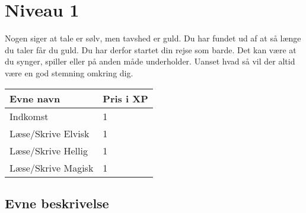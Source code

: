 \chapter*{Niveau 1}
Nogen siger at tale er sølv, men tavshed er guld. Du har fundet ud af at så længe du taler får du guld. Du har derfor startet din rejse som barde. Det kan være at du synger, spiller eller på anden måde underholder. Uanset hvad så vil der altid være en god stemning omkring dig.
\begin{table}[H]
    \centering
    \begin{tabular}{|p{}|p{}|}
    \rowcolor{cerulean!80}\hline
        Evne navn & Pris i XP \\\hline
         Indkomst & 1 \\\hline
         Læse/Skrive Elvisk & 1 \\\hline
         Læse/Skrive Hellig & 1 \\\hline
         Læse/Skrive Magisk & 1 \\\hline
    \end{tabular}
\end{table} 

\section*{Evne beskrivelse}








